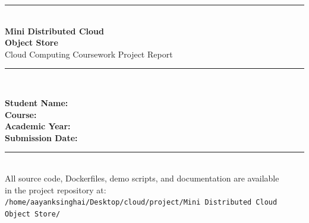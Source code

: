 \documentclass[12pt,a4paper]{report}
\begin{document}
\begin{titlepage}
  \centering
  \vspace*{1cm}

  {\color{primaryblue}\rule{\linewidth}{2pt}}\\[0.6cm]

  {\Huge\bfseries\color{primaryblue} Mini Distributed Cloud\\[6pt]Object Store}\\[0.4cm]
  {\large\color{darkgray} Cloud Computing Coursework Project Report}\\[0.3cm]
  {\color{primaryblue}\rule{\linewidth}{1pt}}\\[1.5cm]

  \begin{figure}[H]
    \centering
  \end{figure}

  \vspace{1cm}

  {\large\bfseries Student Name:} \\[0.3cm]
  {\large\bfseries Course:} \\[0.3cm]
  {\large\bfseries Academic Year:} \\[0.3cm]
  {\large\bfseries Submission Date:} \\[0.3cm]

  \vfill

  {\color{primaryblue}\rule{\linewidth}{1pt}}\\[0.3cm]
  {\small\color{darkgray} All source code, Dockerfiles, demo scripts, and documentation are available\\
  in the project repository at:\\[4pt]
  \texttt{/home/aayanksinghai/Desktop/cloud/project/Mini Distributed Cloud Object Store/}}
\end{titlepage}

\tableofcontents
\newpage
\listoffigures
\newpage
\listoftables
\newpage
\end{document}
